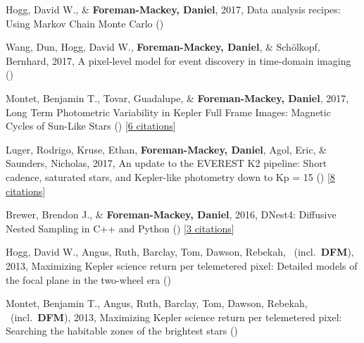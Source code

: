 \item[{\color{numcolor}\scriptsize7}] Hogg, David W., \& \textbf{Foreman-Mackey, Daniel}, 2017, Data analysis recipes: Using Markov Chain Monte Carlo ()

\item[{\color{numcolor}\scriptsize6}] Wang, Dun, Hogg, David W., \textbf{Foreman-Mackey, Daniel}, \& Sch{\"o}lkopf, Bernhard, 2017, A pixel-level model for event discovery in time-domain imaging ()

\item[{\color{numcolor}\scriptsize5}] Montet, Benjamin T., Tovar, Guadalupe, \& \textbf{Foreman-Mackey, Daniel}, 2017, Long Term Photometric Variability in Kepler Full Frame Images: Magnetic Cycles of Sun-Like Stars () [\href{http://adsabs.harvard.edu/abs/2017arXiv170507928M}{6 citations}]

\item[{\color{numcolor}\scriptsize4}] Luger, Rodrigo, Kruse, Ethan, \textbf{Foreman-Mackey, Daniel}, Agol, Eric, \& Saunders, Nicholas, 2017, An update to the EVEREST K2 pipeline: Short cadence, saturated stars, and Kepler-like photometry down to Kp = 15 () [\href{http://adsabs.harvard.edu/abs/2017arXiv170205488L}{8 citations}]

\item[{\color{numcolor}\scriptsize3}] Brewer, Brendon J., \& \textbf{Foreman-Mackey, Daniel}, 2016, DNest4: Diffusive Nested Sampling in C++ and Python () [\href{http://adsabs.harvard.edu/abs/2016arXiv160603757B}{3 citations}]

\item[{\color{numcolor}\scriptsize2}] Hogg, David W., Angus, Ruth, Barclay, Tom, Dawson, Rebekah, \etal\ (incl.\ \textbf{DFM}), 2013, Maximizing Kepler science return per telemetered pixel: Detailed models of the focal plane in the two-wheel era ()

\item[{\color{numcolor}\scriptsize1}] Montet, Benjamin T., Angus, Ruth, Barclay, Tom, Dawson, Rebekah, \etal\ (incl.\ \textbf{DFM}), 2013, Maximizing Kepler science return per telemetered pixel: Searching the habitable zones of the brightest stars ()